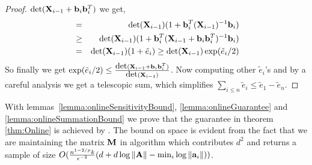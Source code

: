 \begin{proof}{\label{sketch:onlineSummationBound}}
 $\mbox{det}(\mathbf{X}_{i-1}+\mathbf{b}_{i}\mathbf{b}_{i}^T)$ we get,
 \begin{eqnarray*}
  &=& \mbox{det}(\mathbf{X}_{i-1})(1+\mathbf{b}_{i}^T(\mathbf{X}_{i-1})^{-1}\mathbf{b}_{i})  \\
  &\geq& \mbox{det}(\mathbf{X}_{i-1})(1+\mathbf{b}_{i}^T(\mathbf{X}_{i-1}+\mathbf{b}_{i} \mathbf{b}_{i}^T)^{-1}\mathbf{b}_{i})  \\
  &=& \mbox{det}(\mathbf{X}_{i-1})(1+\tilde{e}_{i}) \geq \mbox{det}(\mathbf{X}_{i-1})\exp(\tilde{e}_{i}/2)
 \end{eqnarray*}
 So finally we get $\exp(\tilde{e}_{i}/2) \leq \frac{\mbox{det}(\mathbf{X}_{i-1}+\mathbf{b}_{i}\mathbf{b}_{i}^T)}{\mbox{det}(\mathbf{X}_{i-1})}$. Now computing other $\tilde{e}_{i}$'s and by a careful analysis we get a telescopic sum, which simplifies $\sum_{i\leq n}\tilde{e}_{i} \leq \tilde{e}_{1} - \tilde{e}_{n}$.
\end{proof}
With lemmas~\ref{lemma:onlineSensitivityBound}, \ref{lemma:onlineGuarantee} and \ref{lemma:onlineSummationBound} we prove that the guarantee in theorem \ref{thm:Online} is achieved by \online. The bound on space is evident from the fact that we are maintaining the matrix $\mathbf{M}$ in algorithm which contributes $d^{2}$ and returns a sample of size $O(\frac{n^{1-2/p}k}{\epsilon^{-2}}(d+d\log\|\mathbf{A}\|-\min_{i}\log \|\mathbf{a}_{i}\|))$. 
% 
